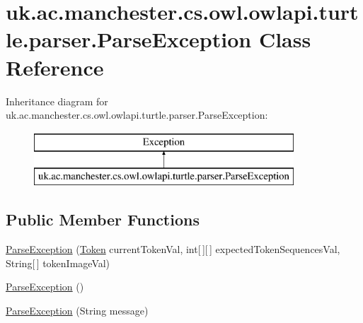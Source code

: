 \hypertarget{classuk_1_1ac_1_1manchester_1_1cs_1_1owl_1_1owlapi_1_1turtle_1_1parser_1_1_parse_exception}{\section{uk.\-ac.\-manchester.\-cs.\-owl.\-owlapi.\-turtle.\-parser.\-Parse\-Exception Class Reference}
\label{classuk_1_1ac_1_1manchester_1_1cs_1_1owl_1_1owlapi_1_1turtle_1_1parser_1_1_parse_exception}
}
Inheritance diagram for uk.\-ac.\-manchester.\-cs.\-owl.\-owlapi.\-turtle.\-parser.\-Parse\-Exception\-:\begin{figure}[H]
\begin{center}
\leavevmode
\includegraphics[height=2.000000cm]{classuk_1_1ac_1_1manchester_1_1cs_1_1owl_1_1owlapi_1_1turtle_1_1parser_1_1_parse_exception}
\end{center}
\end{figure}
\subsection*{Public Member Functions}
\begin{DoxyCompactItemize}
\item 
\hyperlink{classuk_1_1ac_1_1manchester_1_1cs_1_1owl_1_1owlapi_1_1turtle_1_1parser_1_1_parse_exception_a63db42312200dbce60d7facbf0613cbf}{Parse\-Exception} (\hyperlink{classuk_1_1ac_1_1manchester_1_1cs_1_1owl_1_1owlapi_1_1turtle_1_1parser_1_1_token}{Token} current\-Token\-Val, int\mbox{[}$\,$\mbox{]}\mbox{[}$\,$\mbox{]} expected\-Token\-Sequences\-Val, String\mbox{[}$\,$\mbox{]} token\-Image\-Val)
\item 
\hyperlink{classuk_1_1ac_1_1manchester_1_1cs_1_1owl_1_1owlapi_1_1turtle_1_1parser_1_1_parse_exception_a4c75c068df94cc666b0e7138572e0865}{Parse\-Exception} ()
\item 
\hyperlink{classuk_1_1ac_1_1manchester_1_1cs_1_1owl_1_1owlapi_1_1turtle_1_1parser_1_1_parse_exception_a0f71aad5ac85fa809530ab87625ac80f}{Parse\-Exception} (String message)
\end{DoxyCompactItemize}
